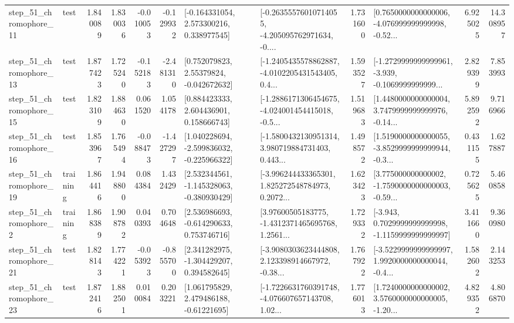 \begin{tabular}{llrrrrllrlrr}
   step\_51\_chromophore\_11 &      test &      1.840089 &    1.830036 &     -0.010053 & -0.129932 &    [-0.164331054, 2.573300216, 0.338977545] &  [-0.26355576010714055, -4.205095762971634, -0.... &       1.731600 &  [0.7650000000000006, -4.076999999999998, -0.52... &            6.925025 &         14.308957 \\
   step\_51\_chromophore\_13 &      test &      1.877423 &    1.725240 &     -0.152183 & -2.481310 &     [0.752079823, 2.55379824, -0.042672632] &  [-1.2405435578862887, -4.0102205431543405, 0.4... &       1.593527 &  [-1.2729999999999961, -3.939, -0.1069999999999... &            2.829399 &          7.853993 \\
   step\_51\_chromophore\_15 &      test &      1.823109 &    1.884630 &      0.061520 &  1.054178 &     [0.884423333, 2.604436901, 0.158666743] &  [-1.2886171306454675, -4.024001454415018, -0.5... &       1.519683 &  [1.4480000000000004, 3.7479999999999976, -0.14... &            5.892592 &          9.716966 \\
   step\_51\_chromophore\_16 &      test &      1.853967 &    1.765494 &     -0.088473 & -1.427297 &   [1.040228694, -2.599836032, -0.225966322] &  [-1.5800432130951314, 3.980719884731403, 0.443... &       1.498572 &  [1.5190000000000055, -3.8529999999999944, -0.3... &            0.431155 &          1.627887 \\
   step\_51\_chromophore\_19 &  training &      1.864416 &    1.948800 &      0.084384 &  1.432429 &   [2.532344561, -1.145328063, -0.380930429] &  [-3.996244433365301, 1.825272548784973, 0.2072... &       1.623423 &  [3.775000000000002, -1.7590000000000003, -0.59... &            0.725625 &          5.460858 \\
    step\_51\_chromophore\_2 &  training &      1.868389 &    1.908782 &      0.040393 &  0.704648 &    [2.536986693, -0.614290633, 0.753746716] &  [3.97600505183775, -1.4312371465695768, 1.2561... &       1.729332 &  [-3.943, 0.7029999999999998, -1.1159999999999997] &            3.411660 &          9.360980 \\
   step\_51\_chromophore\_21 &      test &      1.828143 &    1.774221 &     -0.053923 & -0.855700 &    [2.341282975, -1.304429207, 0.394582645] &  [-3.9080303623444808, 2.123398914667972, -0.38... &       1.767922 &  [-3.5229999999999997, 1.9920000000000044, -0.4... &            1.582602 &          2.143253 \\
   step\_51\_chromophore\_23 &      test &      1.872416 &    1.882501 &      0.010084 &  0.203221 &     [1.061795829, 2.479486188, -0.61221695] &  [-1.7226631760391748, -4.076607657143708, 1.02... &       1.776013 &  [1.7240000000000002, 3.5760000000000005, -1.20... &            4.829352 &          4.806870 \\

\end{tabular}
